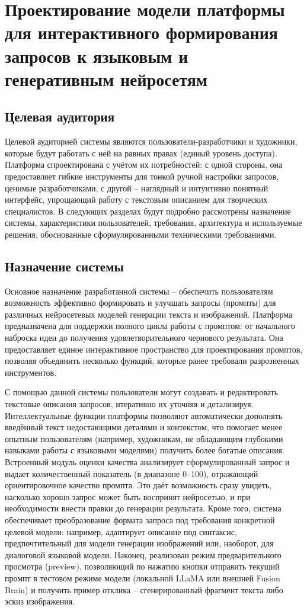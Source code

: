 \section{Проектирование модели платформы для интерактивного формирования
запросов к языковым и генеративным нейросетям}
\label{sec:designing}
\subsection{Целевая аудитория}
Целевой аудиторией системы являются пользователи-разработчики и художники, которые будут работать с ней на равных правах (единый уровень доступа). Платформа спроектирована с учётом их потребностей: с одной стороны, она предоставляет гибкие инструменты для тонкой ручной настройки запросов, ценимые разработчиками, с другой – наглядный и интуитивно понятный интерфейс, упрощающий работу с текстовым описанием для творческих специалистов. В следующих разделах будут подробно рассмотрены назначение системы, характеристики пользователей, требования, архитектура и используемые решения, обоснованные сформулированными техническими требованиями.

\subsection{Назначение системы}
Основное назначение разработанной системы – обеспечить пользователям возможность эффективно формировать и улучшать запросы (промпты) для различных нейросетевых моделей генерации текста и изображений.
Платформа предназначена для поддержки полного цикла работы с промптом: от начального наброска идеи до получения удовлетворительного чернового результата. Она предоставляет единое интерактивное пространство для проектирования промптов, позволяя объединить несколько функций, которые ранее требовали разрозненных инструментов.

С помощью данной системы пользователи могут создавать и редактировать текстовые описания запросов, итеративно их уточняя и детализируя. Интеллектуальные функции платформы позволяют автоматически дополнять введённый текст недостающими деталями и контекстом, что помогает менее опытным пользователям (например, художникам, не обладающим глубокими навыками работы с языковыми моделями) получить более богатые описания. Встроенный модуль оценки качества анализирует сформулированный запрос и выдает количественный показатель (в диапазоне 0–100), отражающий ориентировочное качество промпта. Это даёт возможность сразу увидеть, насколько хорошо запрос может быть воспринят нейросетью, и при необходимости внести правки до генерации результата. Кроме того, система обеспечивает преобразование формата запроса под требования конкретной целевой модели: например, адаптирует описание под синтаксис, предпочтительный для модели генерации изображений или, наоборот, для диалоговой языковой модели. Наконец, реализован режим предварительного просмотра (preview), позволяющий по нажатию кнопки отправить текущий промпт в тестовом режиме модели (локальной LLaMA или внешней Fusion Brain) и получить пример отклика – сгенерированный фрагмент текста либо эскиз изображения.

